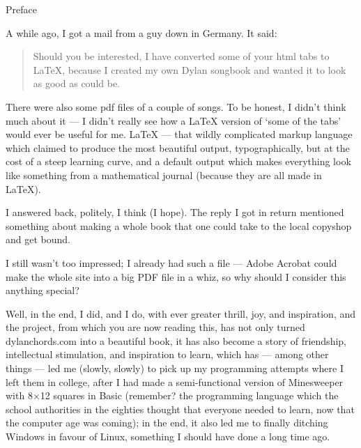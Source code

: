 
\thispagestyle{empty}
\label{preface}

\vspace*{20ex}

\begin{articlelayout}
\begin{flushright}{\Huge Preface}\end{flushright}

\vspace{10ex}
    
\noindent A while ago, I got a mail from a guy down in Germany. It said:

\begin{quote}
Should you be interested, I have converted some of your html tabs to
LaTeX, because I created my own Dylan songbook and wanted it to look
as good as could be.
\end{quote}
  
There were also some pdf files of a couple of songs. To be honest, I
didn't think much about it --- I didn't really see how a LaTeX version
of `some of the tabs' would ever be useful for me. LaTeX ---
that wildly complicated markup language which claimed to produce the
most beautiful output, typographically, but at the cost of a steep
learning curve, and a default output which makes everything look like
something from a mathematical journal (because they are all made in
LaTeX).
 
I answered back, politely, I think (I hope). The reply I got in return
mentioned something about making a whole book that one could take to
the local copyshop and get bound.
 
I still wasn't too impressed; I already had such a file --- Adobe
Acrobat could make the whole site into a big PDF file in a whiz, so
why should I consider this anything special?
  
Well, in the end, I did, and I do, with ever greater thrill, joy, and
inspiration, and the project, from which you are now reading this, has
not only turned dylanchords.com into a beautiful book, it has also
become a story of friendship, intellectual stimulation, and
inspiration to learn, which has --- among other things --- led me
(slowly, slowly) to pick up my programming attempts where I left them
in college, after I had made a semi-functional version of Minesweeper
with 8$\times$12 squares in Basic (remember? the programming language which
the school authorities in the eighties thought that everyone needed to
learn, now that the computer age was coming); in the end, it also led
me to finally ditching Windows in favour of Linux, something I should
have done a long time ago.


\end{articlelayout}
